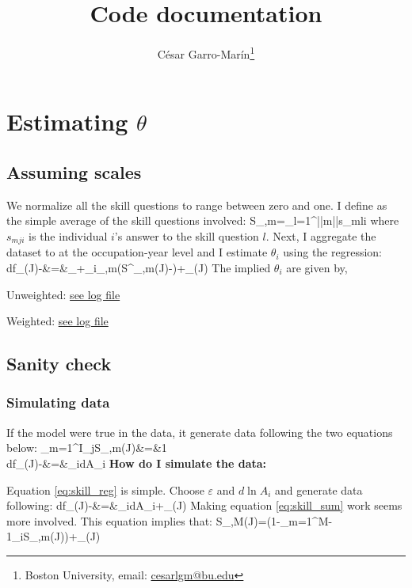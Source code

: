 \documentclass[a4paper, 12pt]{article}
\title{Code documentation}
\author{C\'esar Garro-Mar\'in\thanks{Boston University, email: \href{mailto:cesarlgm@bu.edu}{cesarlgm@bu.edu}}}
\begin{document}
\maketitle

\newcommand{\ntimes}{4 }
\section{Estimating $\theta$}
\subsection{Assuming scales}
We normalize all the skill questions to range between zero and one. I define as the simple average of the skill questions involved:
\beqns
	S_{\theta,m}=\sum_{l=1}^{||m||}s_{mli}
\eeqns
where $s_{mji}$ is the individual $i$'s answer to the skill question $l$. Next, I aggregate the dataset to at the occupation-year level and I estimate $\theta_i$ using the regression:
\beqns
		d\ln f_\theta(J)-&=&\pi_\theta+\sum_{i}\beta_{\theta,m}(S^\star_{\theta,m}(J)-)+\nu_{\theta}(J)
\eeqns
The implied $\theta_i$ are given by,
\bitem 
	\item Unweighted: \href{https://www.dropbox.com/s/epmal84fzmnwiam/unweighted_thetas.txt?dl=0}{see log file}
	\item Weighted: \href{https://www.dropbox.com/s/bkq8o6zcjmgpjf8/weighted_thetas.txt?dl=0}{see log file}
\eitem 




\subsection{Sanity check}
\subsubsection{Simulating data}
If the model were true in the data, it generate data following the two equations below:
\beqn
\sum_{m=1}^I\theta_jS_{\theta,m}(J)&=&1 \label{eq:skill_sum}\\
d\ln f_\theta(J)-&=&\sum_id\ln A_i  \label{eq:skill_reg}
\eeqn
\textbf{How do I simulate the data:}

Equation \eqref{eq:skill_reg} is simple. Choose $\varepsilon$ and $d\ln A_i$ and generate data following:
\beqns
d\ln f_\theta(J)-&=&\sum_id\ln A_i+\nu_\theta(J)
\eeqns
Making equation \eqref{eq:skill_sum} work seems more involved. This equation implies that:
\beqns
	S_{\theta,M}(J)=\left(1-\sum_{m=1}^{M-1}\theta_{i}S_{\theta,m}(J)\right)+\eta_{\theta}(J)
\eeqns
\end{document}
